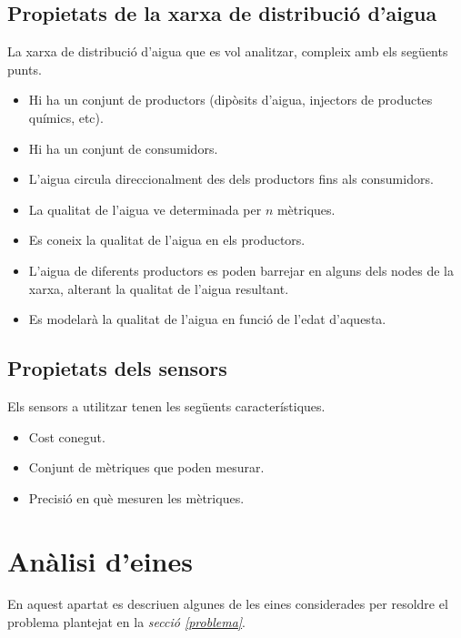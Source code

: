 \documentclass[12pt]{article}
\begin{document}
\subsection{Propietats de la xarxa de distribució d'aigua}
La xarxa de distribució d'aigua que es vol analitzar, compleix amb els següents punts.
\begin{itemize}
	\item Hi ha un conjunt de productors (dipòsits d'aigua, injectors de productes químics, etc).
	\item Hi ha un conjunt de consumidors.
	\item L'aigua circula direccionalment des dels productors fins als consumidors.
	\item La qualitat de l'aigua ve determinada per $n$ mètriques.
	\item Es coneix la qualitat de l'aigua en els productors.
	\item L'aigua de diferents productors es poden barrejar en alguns dels nodes de la xarxa, alterant la qualitat de l'aigua resultant. 
	\item Es modelarà la qualitat de l'aigua en funció de l'edat d'aquesta.
\end{itemize}

\subsection{Propietats dels sensors}
Els sensors a utilitzar tenen les següents característiques.
\begin{itemize}
	\item Cost conegut.
	\item Conjunt de mètriques que poden mesurar.
	\item Precisió en què mesuren les mètriques.
\end{itemize}


\clearpage
\section{Anàlisi d'eines}
En aquest apartat es descriuen algunes de les eines considerades per resoldre el problema plantejat en la \textit{secció \ref{problema}}.
\end{document}
